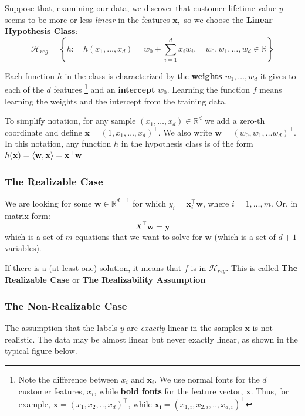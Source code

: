 \documentclass[11pt]{article}
\newcommand{\R}{\ensuremath{\mathbb{R}}}
\newcommand{\Tr}{\ensuremath{\top}}
\newcommand{\Hc}{\mathcal{H}}
\begin{document}
 Suppose that, examining our data, we discover that customer lifetime value $y$ seems to be more or less \textit{linear} in the features $\mathbf{x},$ so we choose the \textbf{Linear Hypothesis Class}:
    \[
 \Hc_{reg} = \left\{h: \quad h(x_1,\ldots,x_d)= w_0 + \sum_{i=1}^d x_i w_i,  \quad w_0,w_1,\ldots, w_d\in\R
 \right\}
    \]

 Each function $h$ in the class is characterized by the \textbf{weights} $w_1,\ldots,w_d$ it gives to each of the $d$ features
 \footnote{Note the difference between $x_i$ and $\mathbf{x}_i$. We use normal fonts for the $d$ customer features, $x_i$, while \textbf{bold fonts} for the feature vector, $\mathbf{x}.$ Thus, for example, $\mathbf{x}=(x_1,x_2,..,x_d)^\Tr$, while  $\mathbf{x_i}=(x_{1,i},x_{2,i},..,x_{d,i})^\Tr$ }
 and an \textbf{intercept} $w_0$. Learning the function $f$ means learning the weights and the intercept from the training data.
 \vspace{5mm}

 To simplify notation, for any sample $(x_1,\ldots,x_d)\in\R^d$ we add a zero-th coordinate and define $\mathbf{x}=(1,x_1,\ldots,x_d)^\Tr.$ We also write $\mathbf{w}=(w_0,w_1,\ldots w_d)^\Tr.$
 In this notation, any function $h$ in the hypothesis class is of the form $h(\mathbf{x})=\inner{\mathbf{w},\mathbf{x}} = \mathbf{x}^\Tr \mathbf{w}$


\subsubsection{The Realizable Case}

We are looking for some $\mathbf{w}\in\R^{d+1}$ for which  $y_i=\mathbf{x}_i^\Tr\mathbf{w}$, where $i=1,\ldots,m$.
Or, in matrix form:
$$X^\Tr \mathbf{w}=\mathbf{y}$$
which is a set of $m$ equations that we want to solve for $\mathbf{w}$ (which is a set of $d+1$ variables).
\vspace{5mm}

If there is a (at least one) solution, it means that  $f$ is in  $\Hc_{reg}$. This is called \textbf{The Realizable Case} or \textbf{The Realizability Assumption}

\subsubsection{The Non-Realizable Case}

The assumption that the labels $y$ are \textit{exactly} linear in the samples $\mathbf{x}$ is not realistic. The data may be almost linear but never exactly linear, as shown in the typical figure below.
\end{document}
